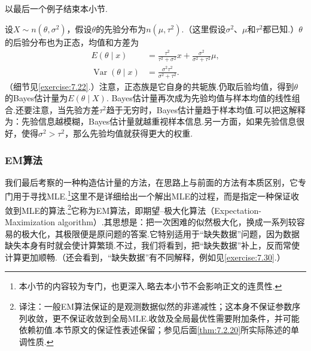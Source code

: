 以最后一个例子结束本小节.
\begin{example}[正态分布的Bayes估计量]\label{ex:7.2.16}
设$X\sim n(\theta,\sigma^2)$，假设$\theta$的先验分布为$n(\mu,\tau^2)$.（这里假设$\sigma^2$、$\mu$和$\tau^2$都已知.）$\theta$的后验分布也为正态，均值和方差为
\begin{equation}\label{eq:7.2.10}
\begin{aligned}
E(\theta\mid x)&=\frac{\tau^2}{\tau^2+\sigma^2}x+\frac{\sigma^2}{\sigma^2+\tau^2}\mu,\\
\operatorname{Var}(\theta\mid x)&=\frac{\sigma^2\tau^2}{\sigma^2+\tau^2}.
\end{aligned}
\end{equation}
（细节见\autoref{exercise:7.22}.）注意，正态族是它自身的共轭族.仍取后验均值，得到$\theta$的Bayes估计量为$E(\theta\mid X)$.
Bayes估计量再次成为先验均值与样本均值的线性组合.还要注意，当先验方差$\tau^2$趋于无穷时，Bayes估计量趋于样本均值.可以把这解释为：先验信息越模糊，Bayes估计量就越重视样本信息.另一方面，如果先验信息很好，使得$\sigma^2>\tau^2$，那么先验均值就获得更大的权重.
\end{example}
\subsubsection{EM算法}\label{sec:7.2.4}
我们最后考察的一种构造估计量的方法，在思路上与前面的方法有本质区别，它专门用于寻找MLE.\footnote{本小节的内容较为专门，也更深入.略去本小节不会影响正文的连贯性.}这里不是详细给出一个解出MLE的过程，而是指定一种保证收敛到MLE的算法.\footnote{译注：一般EM算法保证的是观测数据似然的非递减性；这本身不保证参数序列收敛，更不保证收敛到全局MLE.收敛及全局最优性需要附加条件，并可能依赖初值.本节原文的保证性表述保留；参见后面\autoref{thm:7.2.20}所实际陈述的单调性质.}它称为EM算法，即期望--极大化算法（Expectation-Maximization algorithm）.其思想是：把一次困难的似然极大化，换成一系列较容易的极大化，其极限便是原问题的答案.它特别适用于“缺失数据”问题，因为数据缺失本身有时就会使计算繁琐.不过，我们将看到，把“缺失数据”补上，反而常使计算更加顺畅.（还会看到，“缺失数据”有不同解释，例如见\autoref{exercise:7.30}.）


